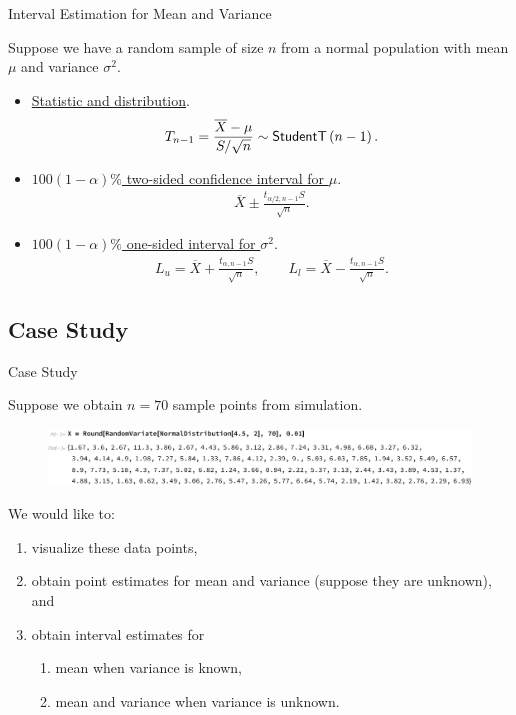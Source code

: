 \begin{frame}{Interval Estimation for Mean and Variance}

\justifying
{} Suppose we have a random sample of size $n$ from a normal population with  mean $\mu$ and  variance $\sigma^2$.
\begin{itemize}
	\item \underline{Statistic and distribution}.
	\begin{align*}
	T_{n-1} = \frac{\overline{X} - \mu}{S/\sqrt{n}} \sim \mathsf{StudentT}\left(n-1 \right).
	\end{align*}
	\item \underline{$100(1-\alpha)\%$ two-sided confidence interval for $\mu$}.
	\begin{align*}
	\overline{X} \pm \frac{t_{\alpha/2, n-1} S}{\sqrt{n}}.
	\end{align*}
	\item \underline{$100(1-\alpha)\%$ one-sided interval for $\sigma^2$}.
	\begin{align*}
	L_u = \overline{X} + \frac{t_{\alpha, n-1}S}{\sqrt{n}}, \qquad L_l = \overline{X} - \frac{t_{\alpha, n-1}S}{\sqrt{n}}.
	\end{align*}
\end{itemize}

\end{frame}


\subsection{Case Study}

\begin{frame}{Case Study}

\justifying
Suppose we obtain $n = 70$ sample points from simulation.
\begin{figure}[htbp]
	\centering
	\includegraphics[width=\linewidth]{./images/rc4fig6.pdf}
\end{figure}
We would like to:
\begin{enumerate}
	\justifying
	\item visualize these data points,
	\item obtain point estimates for mean and variance (suppose they are unknown), and
	\item obtain interval estimates for
	\begin{enumerate}
		\justifying
		\item mean when variance is known,
		\item mean and variance when variance is unknown.
	\end{enumerate}
\end{enumerate}

\end{frame}

